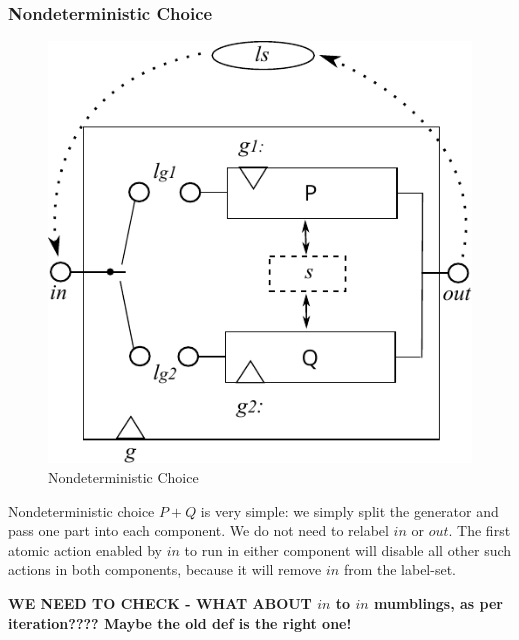 \newpage
\subsubsection{Nondeterministic Choice}

\begin{figure}
  \centering
  \includegraphics{images/nondet-actual}
  \caption{Nondeterministic Choice}
  \label{fig:nondet-choice}
\end{figure}

Nondeterministic choice $P+Q$ is very simple:
we simply split the generator and pass one part
into each component. We do not need to relabel $in$
or $out$.
The first atomic action enabled by $in$ to
run in either component will disable all other such actions in both components,
because it will remove $in$ from the label-set.

\textbf{WE NEED TO CHECK - WHAT ABOUT $in$ to $in$ mumblings, as per iteration???? Maybe the old def is the right one!}



